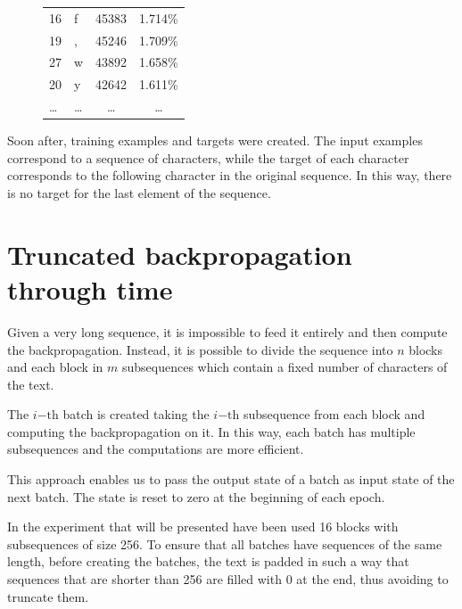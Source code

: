 \documentclass[a4paper,12pt]{article} %
\begin{document}
\begin{figure}[htb]
\begin{tabular}{llcc}
			16       &         f &               45383 &             1.714\% \\
			19       &         , &               45246 &             1.709\% \\
			27       &         w &               43892 &             1.658\% \\
			20       &         y &               42642 &             1.611\% \\
			\dots       &         \dots &                \dots &             
			\dots 
			\\
			\bottomrule
		\end{tabular}
		\label{tab:statistics}
	\end{figure}

	\bigskip
	Soon after, training examples and targets were created. The input examples 
	correspond to a sequence of characters, while the target of each character 
	corresponds to the following character in the original sequence. In this 
	way, there is no target for the last element of the sequence.
	
	\section{Truncated backpropagation through time}
	\label{section:backpropagation}
	
	Given a very long sequence, it is impossible to feed it entirely and 
	then compute the backpropagation. Instead, it is possible to divide the 
	sequence into $n$ blocks and each block in $m$ subsequences which contain a 
	fixed number of characters of the text.\bigskip
	
	The $i\mathrm{-th}$ batch is created taking the $i\mathrm{-th}$ subsequence 
	from each block and computing the backpropagation on it. In this way, each 
	batch has multiple subsequences and the computations are more efficient.
	
	This approach enables us to pass the output state of a batch as input state 
	of the next batch. The state is reset to zero at the beginning of each 
	epoch.\bigskip
	
	In the experiment that will be presented have been used 16 blocks with 
	subsequences of size 256. 
	To ensure that all batches have sequences of the same length, before 
	creating the batches, the text is padded in such a way that sequences that 
	are shorter than 256 are filled with 0 at the end, thus avoiding to 
	truncate them.
	
\end{document}
